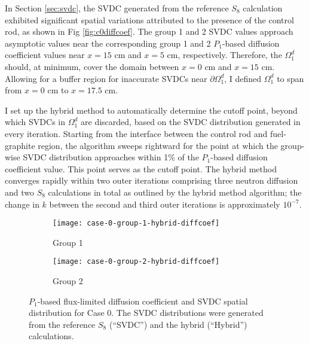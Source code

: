 In Section \ref{sec:svdc}, the \gls{SVDC} generated from the reference $S_8$ calculation exhibited
significant spatial variations attributed to the presence of the control rod, as shown in Fig
\ref{fig:c0diffcoef}. The group 1 and 2 \gls{SVDC} values approach asymptotic values near the
corresponding group 1 and 2 $P_1$-based diffusion coefficient values near $x=15$ cm and $x=5$ cm,
respectively. Therefore, the $\Omega^d_1$ should, at minimum, cover the domain between $x=0$ cm and
$x=15$ cm. Allowing for a buffer region for inaccurate \glspl{SVDC} near $\partial\Omega^d_1$, I
defined $\Omega^d_1$ to span from $x=0$ cm to $x=17.5$ cm.

I set up the hybrid method to automatically determine the cutoff point, beyond which \glspl{SVDC}
in $\Omega^d_1$ are discarded, based on the \gls{SVDC} distribution generated in every iteration.
Starting from the interface between the control rod and fuel-graphite region, the algorithm sweeps
rightward for the point at which the group-wise \gls{SVDC} distribution approaches within 1\% of
the $P_1$-based diffusion coefficient value. This point serves as the cutoff point. The hybrid
method converges rapidly within two outer iterations comprising three neutron diffusion and two
$S_8$ calculations in total as outlined by the hybrid method algorithm; the change in $k$ between
the second and third outer iterations is approximately $10^{-7}$.
%
\begin{figure}[htb!]
  \centering
  \begin{subfigure}[b]{.49\textwidth}
    \centering
    \texttt{[image: case-0-group-1-hybrid-diffcoef]}
    \caption{Group 1}
    \label{fig:c0g1hd}
  \end{subfigure}
  \hfill
  \begin{subfigure}[b]{.49\textwidth}
    \centering
    \texttt{[image: case-0-group-2-hybrid-diffcoef]}
    \caption{Group 2}
    \label{fig:c0g2hd}
  \end{subfigure}
  \caption{$P_1$-based flux-limited diffusion coefficient and \gls{SVDC} spatial distribution for
  Case 0. The \gls{SVDC} distributions were generated from the reference $S_8$ (``SVDC'') and the
  hybrid (``Hybrid'') calculations.}
  \label{fig:c0hd}
\end{figure}

